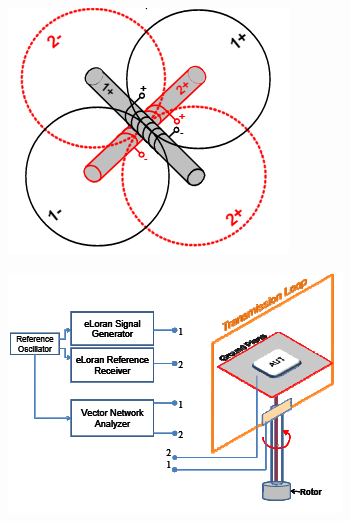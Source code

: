 \vspace{3mm}
\begin{figure}[!ht]
\centering
\begin{minipage}{.5\textwidth}
  \centering
  \includegraphics[height=0.7\linewidth]{Figures/ELORAN_hfield_conf.PNG}
  \label{fig:eloranhfieldconf}
\end{minipage}%
\begin{minipage}{0.5\textwidth}
  \centering
  \includegraphics[height=0.7\linewidth]{Figures/ELORAN_hfield__antenna_component.PNG}
  \label{fig:eloranhfieldantennacompconf}
\end{minipage}
\end{figure}
\vspace{3mm}


